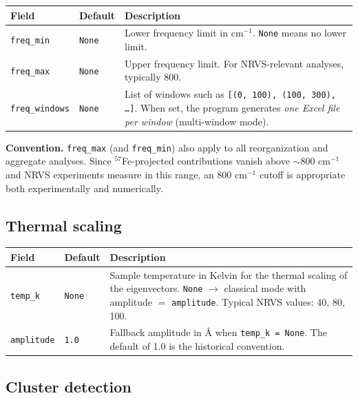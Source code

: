\documentclass[11pt,a4paper,twoside]{article}
\theoremstyle{remark}
\begin{document}
\begin{longtable}{p{} p{} p{}}
\toprule
\textbf{Field} & \textbf{Default} & \textbf{Description} \\
\midrule
\endhead
\texttt{freq\_min}      & \texttt{None} & Lower frequency limit in
  cm$^{-1}$. \texttt{None} means no lower limit. \\
\texttt{freq\_max}      & \texttt{None} & Upper frequency limit.
  For NRVS-relevant analyses, typically 800. \\
\texttt{freq\_windows}  & \texttt{None} & List of windows such as
  \texttt{[(0, 100), (100, 300), \ldots]}. When set, the program
  generates \emph{one Excel file per window} (multi-window mode). \\
\bottomrule
\end{longtable}

\begin{infobox}
\textbf{Convention.} \texttt{freq\_max} (and \texttt{freq\_min})
also apply to all reorganization and aggregate analyses. Since
$^{57}$Fe-projected contributions vanish above $\sim$800 cm$^{-1}$
and NRVS experiments measure in this range, an 800 cm$^{-1}$
cutoff is appropriate both experimentally and numerically.
\end{infobox}

\subsection{Thermal scaling}

\begin{longtable}{p{} p{} p{}}
\toprule
\textbf{Field} & \textbf{Default} & \textbf{Description} \\
\midrule
\endhead
\texttt{temp\_k}       & \texttt{None} & Sample temperature in
  Kelvin for the thermal scaling of the eigenvectors.
  \texttt{None} $\to$ classical mode with amplitude $=$
  \texttt{amplitude}. Typical NRVS values: 40, 80, 100. \\
\texttt{amplitude}      & \texttt{1.0}  & Fallback amplitude in
  \AA{} when \texttt{temp\_k = None}. The default of 1.0 is the
  historical convention. \\
\bottomrule
\end{longtable}

\subsection{Cluster detection}
\end{document}
